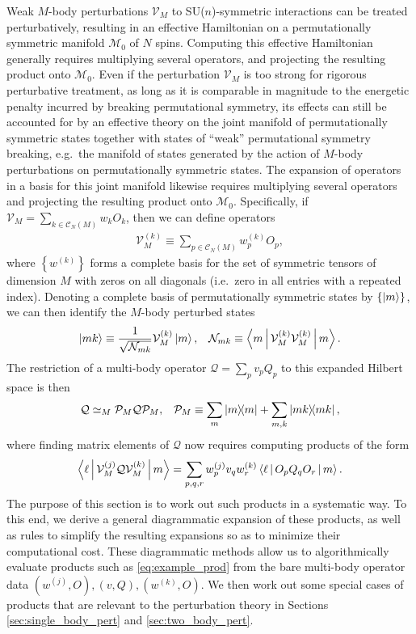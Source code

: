 \documentclass[nofootinbib,notitlepage,11pt]{revtex4-2}
\newcommand{\f}[2]{\dfrac{#1}{#2}} %
\newcommand{\p}[1]{\left(#1\right)} %
\renewcommand{\set}[1]{\left\{#1\right\}} %
\newcommand{\bk}{\Braket} %
\newcommand{\1}{\mathds{1}}
\newcommand{\C}{\mathcal{C}}
\newcommand{\M}{\mathcal{M}}
\newcommand{\N}{\mathcal{N}}
\renewcommand{\P}{\mathcal{P}}
\newcommand{\Q}{\mathcal{Q}}
\newcommand{\V}{\mathcal{V}}
\begin{document}
Weak $M$-body perturbations $\V_M$ to SU($n$)-symmetric interactions
can be treated perturbatively, resulting in an effective Hamiltonian
on a permutationally symmetric manifold $\M_0$ of $N$ spins.
Computing this effective Hamiltonian generally requires multiplying
several operators, and projecting the resulting product onto $\M_0$.
Even if the perturbation $\V_M$ is too strong for rigorous
perturbative treatment, as long as it is comparable in magnitude to
the energetic penalty incurred by breaking permutational symmetry, its
effects can still be accounted for by an effective theory on the joint
manifold of permutationally symmetric states together with states of
``weak'' permutational symmetry breaking, e.g.~the manifold of states
generated by the action of $M$-body perturbations on permutationally
symmetric states.  The expansion of operators in a basis for this
joint manifold likewise requires multiplying several operators and
projecting the resulting product onto $\M_0$.  Specifically, if
$\V_M=\sum_{k\in\C_N\p{M}}w_kO_k$, then we can define operators
\begin{align}
  \V_M^{(k)} \equiv \sum_{p\in\C_N\p{M}} w^{(k)}_p O_p,
\end{align}
where $\set{w^{(k)}}$ forms a complete basis for the set of symmetric
tensors of dimension $M$ with zeros on all diagonals (i.e.~zero in all
entries with a repeated index).  Denoting a complete basis of
permutationally symmetric states by $\set{\ket{m}}$, we can then
identify the $M$-body perturbed states
\begin{align}
  \ket{mk} \equiv \f1{\sqrt{\N_{mk}}} \V_M^{(k)} \ket{m},
  &&
  \N_{mk} \equiv \bk{m | \V_M^{(k)} \V_M^{(k)} | m}.
\end{align}
The restriction of a multi-body operator $\Q=\sum_p v_p Q_p$ to this
expanded Hilbert space is then
\begin{align}
  \Q \simeq_M \P_M \Q \P_M,
  &&
  \P_M \equiv \sum_m \op{m} + \sum_{m,k} \op{mk},
\end{align}
where finding matrix elements of $\Q$ now requires computing products
of the form
\begin{align}
  \bk{\ell | \V_M^{(j)} \Q \V_M^{(k)} | m}
  = \sum_{p,q,r} w^{(j)}_p v_q w^{(k)}_r \bk{\ell | O_p Q_q O_r | m}.
  \label{eq:example_prod}
\end{align}
The purpose of this section is to work out such products in a
systematic way.  To this end, we derive a general diagrammatic
expansion of these products, as well as rules to simplify the
resulting expansions so as to minimize their computational cost.
These diagrammatic methods allow us to algorithmically evaluate
products such as \eqref{eq:example_prod} from the bare multi-body
operator data $\p{w^{(j)},O},\p{v,Q},\p{w^{(k)},O}$.  We then work out
some special cases of products that are relevant to the perturbation
theory in Sections \ref{sec:single_body_pert} and
\ref{sec:two_body_pert}.
\end{document}
